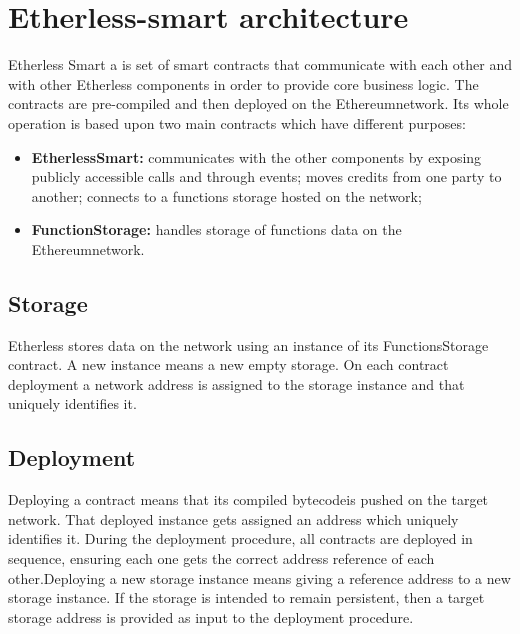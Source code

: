 \section{Etherless-smart architecture}
Etherless Smart a is set of smart contracts that communicate with each other and with other Etherless components in order to provide core business logic. The contracts are pre-compiled and then deployed on the Ethereum\glo network.\newline
Its whole operation is based upon two main contracts which have different purposes:
\begin{itemize}
	\item \textbf{EtherlessSmart:} communicates with the other components by exposing publicly accessible calls and through events; moves credits from one party to another; connects to a functions storage hosted on the network;
	\item \textbf{FunctionStorage:} handles storage of functions data on the Ethereum\glo network.
\end{itemize}
\subsection{Storage}
Etherless stores data on the network using an instance of its FunctionsStorage contract. A new instance means a new empty storage. On each contract deployment a network address is assigned to the storage instance and that uniquely identifies it.
\subsection{Deployment}
Deploying a contract means that its compiled bytecode\glo is pushed on the target network. That deployed instance gets assigned an address which uniquely identifies it. During the deployment procedure, all contracts are deployed in sequence, ensuring each one gets the correct address reference of each other.\newline Deploying a new storage instance means giving a reference address to a new storage instance. If the storage is intended to remain persistent, then a target storage address is provided as input to the deployment procedure.
